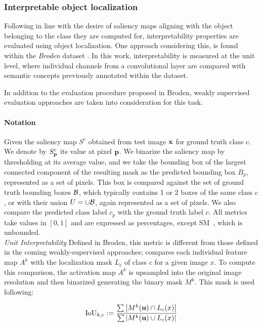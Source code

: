\subsubsection{Interpretable object localization}
\label{sec:loc-metrics}
Following in line with the desire of saliency maps aligning with the object belonging to the class 
they are computed for, interpretability properties are evaluated using object localization.
One approach considering this, is found within the \emph{Broden} dataset 
\autocite{bau2017network}. In this work, interpretability is measured at the unit level, where 
individual channels from a convolutional layer are compared with semantic concepts previously 
annotated within the dataset. 

\noindent In addition to the evaluation procedure proposed in Broden, weakly supervised evaluation 
approaches are taken into consideration for this task. 

\paragraph{Notation} Given the saliency map $S^c$ obtained from test image $\mathbf{x}$ for ground truth 
class $c$. We denote by $S^c_{\mathbf{p}}$ its value at pixel $\mathbf{p}$. We binarize the saliency map by 
thresholding at its average value, and we take the bounding box of the largest connected component 
of the resulting mask as the predicted bounding box $B_p$, represented as a set of pixels. This 
box is compared against the set of ground truth bounding boxes $\mathcal{B}$, which typically contains 1 
or 2 boxes of the same class $c$, or with their union $U = \cup \mathcal{B}$, again represented as a set 
of pixels. We also compare the predicted class label $c_p$ with the ground truth label $c$. All 
metrics take values in $[0,1]$ and are expressed as percentages, except SM~, which is 
unbounded.\\

\noindent \emph{Unit Interpretability} Defined in Broden, this metric is different from those 
defined in the coming weakly-supervised approaches; compares each individual feature map $A^k$ 
with the localization mask $L_c$ of class $c$ for a given image $x$. To compute this comparison, 
the activation map $A^k$ is upsampled into the original image resolution and then binarized 
generating the binary mask $M^k$. This mask is used following:

\begin{equation}
	\operatorname{IoU}_{k,c} \mathrel{:=} \frac{\sum \abs{M^k(\mathbf{u}) \cap L_c(x)}}
					      {\sum \abs{M^k(\mathbf{u}) \cup L_c(x)}}
\end{equation}

